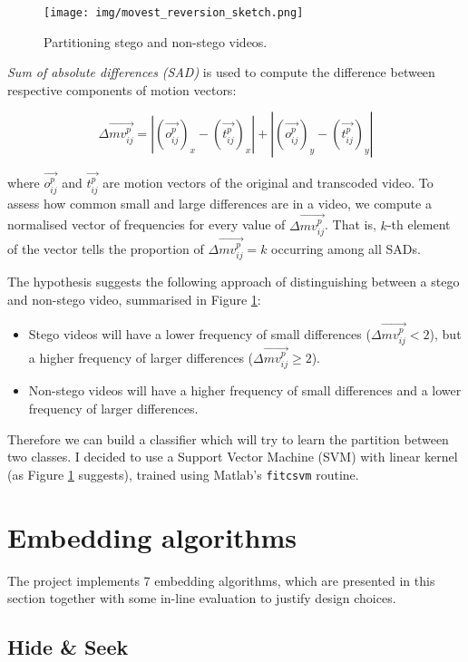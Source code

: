 \documentclass[12pt,british,twoside,notitlepage,usenames,dvipsnames,hypens,final]{report}
\numberwithin{equation}{section}
\numberwithin{figure}{section}
\begin{document}
\begin{figure}
\texttt{[image: img/movest\_reversion\_sketch.png]}
\caption{Partitioning stego and non-stego videos.}
\label{fig:movest-reversion-sketch}
\end{figure}

\emph{Sum of absolute differences (SAD)} is used to compute the difference between respective components of motion vectors:

$$ \Delta \overrightarrow{mv^p_{ij}} = |(\overrightarrow{o^p_{ij}})_x - (\overrightarrow{t^p_{ij}})_x| +  |(\overrightarrow{o^p_{ij}})_y - (\overrightarrow{t^p_{ij}})_y|$$

where $\overrightarrow{o^p_{ij}}$ and $\overrightarrow{t^p_{ij}}$ are motion vectors of the original and transcoded video. To assess how common small and large differences are in a video, we compute a normalised vector of frequencies for every value of $\Delta\overrightarrow{mv^p_{ij}}$. That is, $k$-th element of the vector tells the proportion of $\Delta\overrightarrow{mv^p_{ij}} = k$ occurring among all SADs.

The hypothesis suggests the following approach of distinguishing between a stego and non-stego video, summarised in Figure \ref{fig:movest-reversion-sketch}:
\begin{itemize}
\item Stego videos will have a lower frequency of small differences ($\Delta\overrightarrow{mv^p_{ij}} < 2$), but a higher frequency of larger differences ($\Delta\overrightarrow{mv^p_{ij}} \geq 2$).
\item Non-stego videos will have a higher frequency of small differences and a lower frequency of larger differences.
\end{itemize}

Therefore we can build a classifier which will try to learn the partition between two classes. I decided to use a Support Vector Machine (SVM) with linear kernel (as Figure \ref{fig:movest-reversion-sketch} suggests), trained using Matlab's \texttt{fitcsvm} routine.

\section{Embedding algorithms}
\label{emb-alg}

The project implements 7 embedding algorithms, which are presented in this section together with some in-line evaluation to justify design choices.

\subsection{Hide \& Seek}
\end{document}
